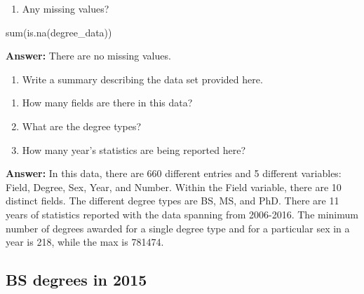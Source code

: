 \documentclass[
]{article}
\newenvironment{Shaded}{\begin{snugshade}}{\end{snugshade}}
\newcommand{\FunctionTok}[1]{\textcolor[rgb]{0.00,0.00,0.00}{#1}}
\newcommand{\NormalTok}[1]{#1}
\newcommand{\SpecialCharTok}[1]{\textcolor[rgb]{0.00,0.00,0.00}{#1}}
\providecommand{\tightlist}{%
  \setlength{\itemsep}{0pt}\setlength{\parskip}{0pt}}
\begin{document}
\begin{enumerate}
\def\labelenumi{\roman{enumi}.}
\setcounter{enumi}{3}
\tightlist
\item
  Any missing values?
\end{enumerate}

\begin{Shaded}
\begin{Highlighting}[]
\FunctionTok{sum}\NormalTok{(}\FunctionTok{is.na}\NormalTok{(degree\_data))}
\end{Highlighting}
\end{Shaded}

\textbf{Answer:} There are no missing values.

\begin{enumerate}
\def\labelenumi{\arabic{enumi}.}
\setcounter{enumi}{1}
\tightlist
\item
  Write a summary describing the data set provided here.
\end{enumerate}

\begin{enumerate}
\def\labelenumi{\roman{enumi}.}
\tightlist
\item
  How many fields are there in this data?
\item
  What are the degree types?
\item
  How many year's statistics are being reported here?
\end{enumerate}

\begin{Shaded}
\end{Shaded}

\textbf{Answer:} In this data, there are 660 different entries and 5
different variables: Field, Degree, Sex, Year, and Number. Within the
Field variable, there are 10 distinct fields. The different degree types
are BS, MS, and PhD. There are 11 years of statistics reported with the
data spanning from 2006-2016. The minimum number of degrees awarded for
a single degree type and for a particular sex in a year is 218, while
the max is 781474.

\hypertarget{bs-degrees-in-2015}{%
\subsection{BS degrees in 2015}\label{bs-degrees-in-2015}}
\end{document}

